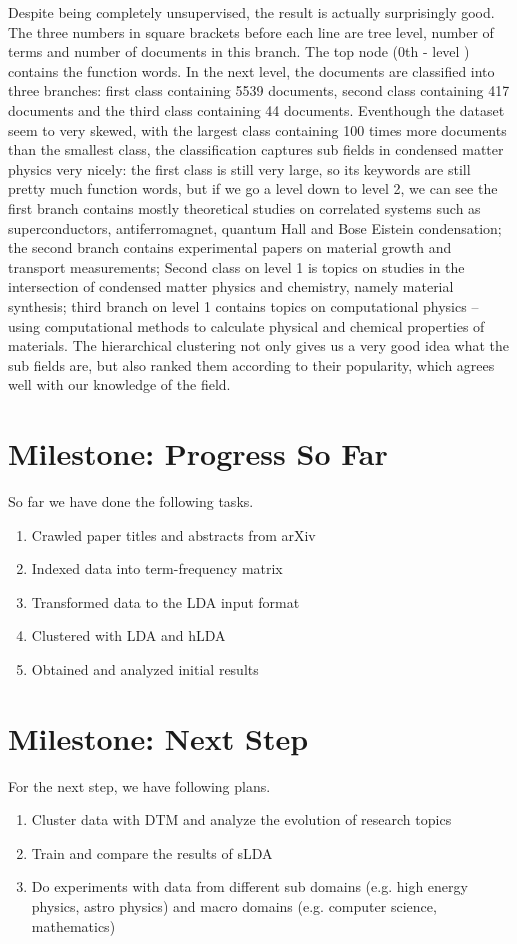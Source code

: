 \documentclass[DIV=calc, paper=a4, fontsize=11pt, twocolumn]{scrartcl}	 %
\begin{document}
\newline
Despite being completely unsupervised, the result is actually surprisingly good. The three numbers in square brackets before each line are tree level, number of terms and number of documents in this branch. The top node (0th - level ) contains the function words. In the next level, the documents are classified into three branches: first class containing 5539 documents, second class containing 417 documents and the third class containing 44 documents. Eventhough the dataset seem to very skewed, with the largest class containing 100 times more documents than the smallest class, the classification captures sub fields in condensed matter physics very nicely: the first class is still very large, so its keywords are still pretty much function words, but if we go a level down to level 2, we can see the first branch contains mostly theoretical studies on correlated systems such as superconductors, antiferromagnet, quantum Hall and Bose Eistein condensation; the second branch contains experimental papers on material growth and transport measurements; Second class on level 1 is topics on studies in the intersection of condensed matter physics and chemistry, namely material synthesis; third branch on level 1 contains topics on computational physics -- using computational methods to calculate physical and chemical properties of materials. The hierarchical clustering not only gives us a very good idea what the sub fields are, but also ranked them according to their popularity, which agrees well with our knowledge of the field.      

\section*{Milestone: Progress So Far}
So far we have done the following tasks.
\begin{enumerate}
\item Crawled paper titles and abstracts from arXiv
\item Indexed data into term-frequency matrix
\item Transformed data to the LDA input format
\item Clustered with LDA and hLDA
\item Obtained and analyzed initial results
\end{enumerate}

\section*{Milestone: Next Step}
For the next step, we have following plans.
\begin{enumerate}
\item Cluster data with DTM and analyze the evolution of research topics
\item Train and compare the results of sLDA
\item Do experiments with data from different sub domains (e.g. high energy physics, astro physics) and macro domains (e.g. computer science, mathematics)
\end{enumerate}
\end{document}
